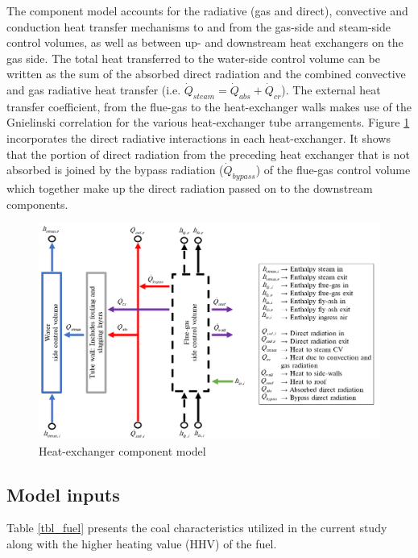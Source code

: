 \documentclass[twocolumn,10pt]{asme2ej}
\begin{document}
The component model accounts for the radiative (gas and direct), convective and conduction heat transfer mechanisms to and from the gas-side and steam-side control volumes, as well as between up- and downstream heat exchangers on the gas side. The total heat transferred to the water-side control volume can be written as the sum of the absorbed direct radiation and the combined convective and gas radiative heat transfer (i.e. $\dot{Q}_{steam}=\dot{Q}_{abs}+\dot{Q}_{cr}$). The external heat transfer coefficient, from the flue-gas to the heat-exchanger walls makes use of the Gnielinski correlation \cite{Gnielinski2016} for the various heat-exchanger tube arrangements. Figure \ref{fig_heat_exchanger_model} incorporates the direct radiative interactions in each heat-exchanger. It shows that the portion of direct radiation from the preceding heat exchanger that is not absorbed is joined by the bypass radiation ($\dot{Q}_{bypass}$) of the flue-gas control volume which together make up  the direct radiation passed on to the downstream components.
\begin{figure}[h!]
\centerline{\includegraphics[scale=0.4]{HEAT_EXCHANGER_PROCESS_MODEL}}
\caption{Heat-exchanger component model}
\label{fig_heat_exchanger_model}
\end{figure}

\subsection{Model inputs}
Table \ref{tbl_fuel} presents the coal characteristics utilized in the current study along with the higher heating value (HHV) of the fuel.\\
\end{document}

